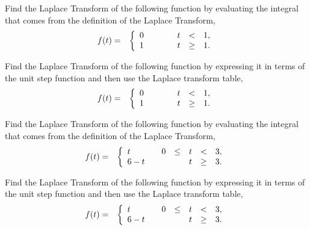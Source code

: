 \begin{problem}

\item Find the Laplace Transform of the following function by
  evaluating the integral that comes from the definition of the
  Laplace Transform,
  \begin{eqnarray}
    f(t) & = & \left\{
      \begin{array}{l@{\hspace{2em}}rcccl}
        0 &    &  & t & < & 1, \\
        1 &    &  & t & \geq & 1. \\
      \end{array}
    \right.
  \end{eqnarray}
  \vfill

\item Find the Laplace Transform of the following function by
  expressing it in terms of the unit step function and then use the
  Laplace transform table,
  \begin{eqnarray}
    f(t) & = & \left\{
      \begin{array}{l@{\hspace{2em}}rcccl}
        0 &    &  & t & < & 1, \\
        1 &    &  & t & \geq & 1. \\
      \end{array}
    \right.
  \end{eqnarray}
  \vfill

\clearpage

\item Find the Laplace Transform of the following function by
  evaluating the integral that comes from the definition of the
  Laplace Transform,
  \begin{eqnarray}
    f(t) & = & \left\{
      \begin{array}{l@{\hspace{2em}}rcccl}
        t & 0 & \leq & t & < & 3, \\
        6-t &  &     & t & \geq & 3. \\
      \end{array}
    \right.
  \end{eqnarray}
  \vfill

\item Find the Laplace Transform of the following function by
  expressing it in terms of the unit step function and then use the
  Laplace transform table,
  \begin{eqnarray}
    f(t) & = & \left\{
      \begin{array}{l@{\hspace{2em}}rcccl}
        t & 0 & \leq & t & < & 3, \\
        6-t &  &     & t & \geq & 3. \\
      \end{array}
    \right.
  \end{eqnarray}
  \vfill


\end{problem}
